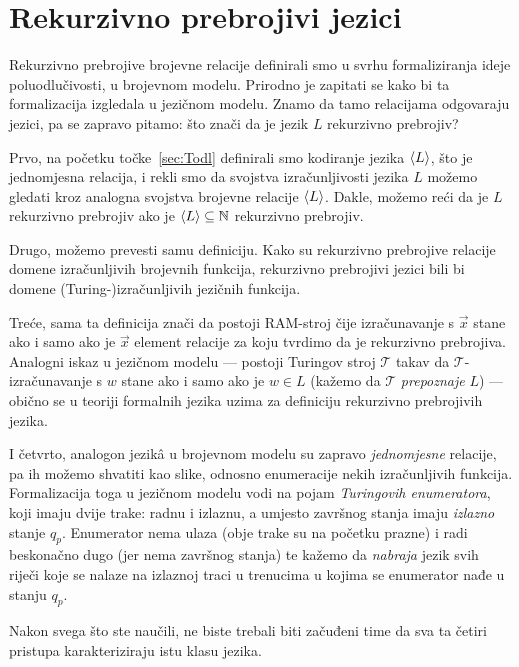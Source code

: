 \section{Rekurzivno prebrojivi jezici}\label{sec:relang}

Rekurzivno prebrojive brojevne relacije definirali smo u svrhu formaliziranja ideje poluodlučivosti, u brojevnom modelu. Prirodno je zapitati se kako bi ta formalizacija izgledala u jezičnom modelu. Znamo da tamo relacijama odgovaraju jezici, pa se zapravo pitamo: što znači da je jezik $L$ rekurzivno prebrojiv?

Prvo, na početku točke~\ref{sec:Todl} definirali smo kodiranje jezika $\langle L\rangle$, što je jednomjesna relacija, i rekli smo da svojstva izračunljivosti jezika $L$ možemo gledati kroz analogna svojstva brojevne relacije $\langle L\rangle$. Dakle, možemo reći da je $L$ rekurzivno prebrojiv ako je $\langle L\rangle\subseteq{\mathbb N}$ rekurzivno prebrojiv.

Drugo, možemo prevesti samu definiciju. Kako su rekurzivno prebrojive relacije domene izračunljivih brojevnih funkcija, rekurzivno prebrojivi jezici bili bi domene (Turing-)izračunljivih jezičnih funkcija.

Treće, sama ta definicija znači da postoji RAM-stroj čije izračunavanje s $\vec x$ stane ako i samo ako je $\vec x$ element relacije za koju tvrdimo da je rekurzivno prebrojiva. Analogni iskaz u jezičnom modelu --- postoji Turingov stroj $\mathcal T$ takav da $\mathcal T$-izračunavanje s $w$ stane ako i samo ako je $w\in L$ (kažemo da $\mathcal T$ \emph{prepoznaje} $L$) --- obično se u teoriji formalnih jezika uzima za definiciju rekurzivno prebrojivih jezika.

I četvrto, analogon jezik\^a u brojevnom modelu su zapravo \emph{jednomjesne} relacije, pa ih možemo shvatiti kao slike, odnosno enumeracije nekih izračunljivih funkcija. Formalizacija toga u jezičnom modelu vodi na pojam \emph{Turingovih enumeratora}, koji imaju dvije trake: radnu i izlaznu, a umjesto završnog stanja imaju \emph{izlazno} stanje $q_p$. Enumerator nema ulaza (obje trake su na početku prazne) i radi beskonačno dugo (jer nema završnog stanja) te kažemo da \emph{nabraja} jezik svih riječi koje se nalaze na izlaznoj traci u trenucima u kojima se enumerator nađe u stanju $q_p$.

Nakon svega što ste naučili, ne biste trebali biti začuđeni time da sva ta četiri pristupa karakteriziraju istu klasu jezika.

